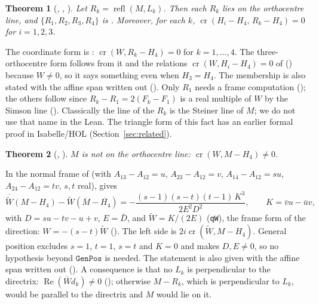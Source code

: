 \documentclass[11pt]{article}
\newtheorem{theorem}{Theorem}
\theoremstyle{definition}
\theoremstyle{remark}
\newcommand{\lean}[1]{\texttt{#1}}
\begin{document}
\begin{theorem}[, , ]\label{thm:refl}
Let $R_k=\operatorname{refl}(M,L_k)$. Then each $R_k$ lies on the orthocentre line, and
$\{R_1,R_2,R_3,R_4\}$ is . Moreover, for each $k$,
$\operatorname{cr}(H_i-H_4,\,R_k-H_4)=0$ for $i=1,2,3$.
\end{theorem}
The coordinate form is : $\operatorname{cr}(W,R_k-H_4)=0$ for $k=1,\dots,4$.
The three-orthocentre form follows from it and the relations $\operatorname{cr}(W,H_i-H_4)=0$ of
\cite{paperE} () because $W\neq0$, so it says something even when
$H_3=H_4$. The membership is also stated with the affine span written out
(). Only $R_1$ needs a frame computation
(); the others follow since $R_k-R_1=2(F_k-F_1)$ is a real multiple of $W$ by
the Simson line (). Classically the line of the $R_k$ is the Steiner line
of $M$; we do not use that name in the Lean. The triangle form of this fact has an earlier formal proof
in Isabelle/HOL \cite{afpsteinerline} (Section~\ref{sec:related}).

\begin{theorem}[, ]\label{thm:off}
$M$ is not on the orthocentre line: $\operatorname{cr}(W,M-H_4)\neq0$.
\end{theorem}
In the normal frame of \cite{paperE} (with $A_{13}-A_{12}=u$, $A_{23}-A_{12}=v$, $A_{14}-A_{12}=su$,
$A_{24}-A_{12}=tv$, $s,t$ real),  gives
\[
  \overline{\widetilde W}(M-H_4)-\widetilde W(\overline{M}-\overline{H_4})
  =-\frac{(s-1)(s-t)(t-1)\,K^3}{2E^2D^2},\qquad K=\bar v u-\bar u v,
\]
with $D=su-tv-u+v$, $E=\bar D$, and $\widetilde W=K/(2E)$ (\lean{qW}), the frame form of the direction:
$W=-(s-t)\widetilde W$ (). The left side is $2i\operatorname{cr}(\widetilde W,M-H_4)$. General position excludes $s=1$, $t=1$, $s=t$
and $K=0$ and makes $D,E\neq0$, so no hypothesis beyond $\lean{GenPos}$ is needed. The statement is also
given with the affine span written out (). A consequence is
that no $L_k$ is perpendicular to the directrix: $\operatorname{Re}(\bar W d_k)\neq0$
(); otherwise $M-R_k$, which is perpendicular to $L_k$, would be
parallel to the directrix and $M$ would lie on it.
\end{document}
